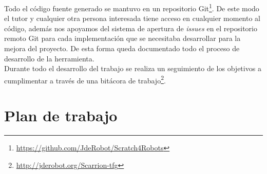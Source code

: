 Todo el código fuente generado se mantuvo en un repositorio Git\footnote{\url{https://github.com/JdeRobot/Scratch4Robots}}. De este modo el tutor y cualquier otra persona interesada tiene acceso en cualquier momento al código, además nos apoyamos del sistema de apertura de \textit{issues} en el repositorio remoto Git para cada implementación que se necesitaba desarrollar para la mejora del proyecto. De esta forma queda documentado todo el proceso de desarrollo de la herramienta.\\

Durante todo el desarrollo del trabajo se realiza un seguimiento de los objetivos a cumplimentar a través de una bitácora de trabajo\footnote{\url{http://jderobot.org/Scarrion-tfg}}.

\section{Plan de trabajo}
\label{sec:plan}

